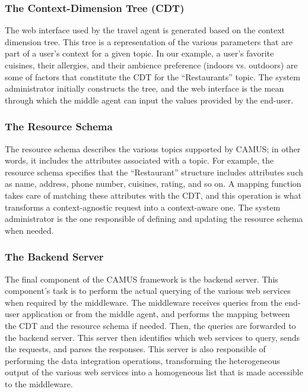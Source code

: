 \subsubsection{The Context-Dimension Tree (CDT)}
The web interface used by the travel agent is generated based on the context dimension tree. This tree is a representation of the various parameters that are part of a user's context for a given topic. In our example, a user's favorite cuisines, their allergies, and their ambience preference (indoors vs. outdoors) are some of factors that constitute the CDT for the ``Restaurants'' topic. The system administrator initially constructs the tree, and the web interface is the mean through which the middle agent can input the values provided by the end-user.
\subsubsection{The Resource Schema}
The resource schema describes the various topics supported by CAMUS; in other words, it includes the attributes associated with a topic. For example, the resource schema specifies that the ``Restaurant'' structure includes attributes such as name, address, phone number, cuisines, rating, and so on. A mapping function takes care of matching these attributes with the CDT, and this operation is what transforms a context-agnostic request into a context-aware one. The system administrator is the one responsible of defining and updating the resource schema when needed.
\subsubsection{The Backend Server}
The final component of the CAMUS framework is the backend server. This component's task is to perform the actual querying of the various web services when required by the middleware. The middleware receives queries from the end-user application or from the middle agent, and performs the mapping between the CDT and the resource schema if needed. Then, the queries are forwarded to the backend server. This server then identifies which web services to query, sends the requests, and parses the responses. This server is also responsible of performing the data integration operations, transforming the heterogeneous output of the various web services into a homogeneous list that is made accessible to the middleware.
